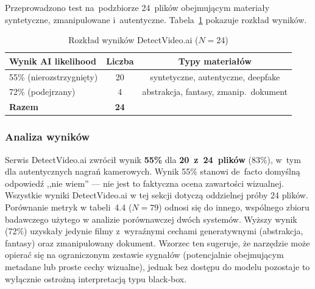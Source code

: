 Przeprowadzono test na~podzbiorze 24~plik\'{o}w obejmuj\k{a}cym
materia\l{}y syntetyczne, zmanipulowane i~autentyczne.
Tabela~\ref{tab:detectvideo_summary} pokazuje rozk\l{}ad wynik\'{o}w.

\begin{table}[htbp]
\centering
{\setlength{\tabcolsep}{8pt}\renewcommand{\arraystretch}{1.3}
\caption{Rozk\l{}ad wynik\'{o}w DetectVideo.ai ($N=24$)}
\label{tab:detectvideo_summary}
\small
\begin{tabular}{lcc}
\toprule
\textbf{Wynik AI likelihood} & \textbf{Liczba} & \textbf{Typy materia\l{}\'{o}w} \\
\midrule
55\% (nierozstrzygni\k{e}ty) & 20 & syntetyczne, autentyczne, deepfake \\
72\% (podejrzany)            &  4 & abstrakcja, fantasy, zmanip.\ dokument \\
\midrule
\textbf{Razem} & \textbf{24} & \\
\bottomrule
\end{tabular}}
\end{table}

\subsubsection{Analiza wynik\'{o}w}

Serwis DetectVideo.ai zwr\'{o}ci\l{} wynik \textbf{55\%} dla \textbf{20~z~24~plik\'{o}w}
(83\%), w~tym dla autentycznych nagra\'{n} kamerowych.
Wynik 55\% stanowi de~facto domy\'{s}ln\k{a} odpowied\'{z} ,,nie wiem'' ---
nie jest to faktyczna ocena zawarto\'{s}ci wizualnej.
Wszystkie wyniki DetectVideo.ai w tej sekcji dotyczą oddzielnej próby 24 plików.
Porównanie metryk w tabeli~4.4 ($N=79$) odnosi się do innego, wspólnego zbioru
badawczego użytego w analizie porównawczej dwóch systemów.
Wy\.{z}szy wynik (72\%) uzyska\l{}y jedynie filmy z~wyra\'{z}nymi
cechami generatywnymi (abstrakcja, fantasy) oraz zmanipulowany
dokument. Wzorzec ten sugeruje, że narzędzie może opierać się
na ograniczonym zestawie sygnałów (potencjalnie obejmującym metadane
lub proste cechy wizualne), jednak bez dostępu do modelu pozostaje to
wyłącznie ostrożną interpretacją typu black-box.


